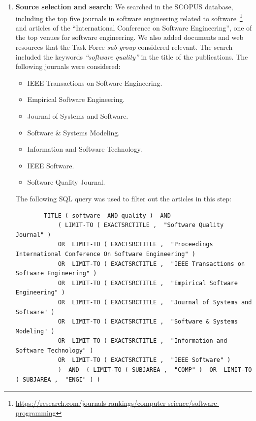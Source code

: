 \begin{enumerate}
    \item \textbf{Source selection and search}: We searched in the SCOPUS database, including the top five journals in software engineering related to software~\footnote{\url{https://research.com/journals-rankings/computer-science/software-programming}} and articles of the  ``International Conference on Software Engineering'', one of the top venues for software engineering. We also added documents and web resources that the Task Force \textit{sub-group} considered relevant. The search included the keywords \textit{``software quality''} in the title of the publications. The following journals were considered:

    \begin{itemize}
        \item IEEE Transactions on Software Engineering.
        \item Empirical Software Engineering.
        \item Journal of Systems and Software.
        \item Software \& Systems Modeling.
        \item Information and Software Technology.
        \item IEEE Software.
        \item Software Quality Journal.
    \end{itemize}

    The following SQL query was used to filter out the articles in this step:
    \begin{tiny}
    \begin{verbatim}
        TITLE ( software  AND quality )  AND  
            ( LIMIT-TO ( EXACTSRCTITLE ,  "Software Quality Journal" )  
            OR  LIMIT-TO ( EXACTSRCTITLE ,  "Proceedings International Conference On Software Engineering" ) 
            OR  LIMIT-TO ( EXACTSRCTITLE ,  "IEEE Transactions on Software Engineering" )
            OR  LIMIT-TO ( EXACTSRCTITLE ,  "Empirical Software Engineering" ) 
            OR  LIMIT-TO ( EXACTSRCTITLE ,  "Journal of Systems and Software" ) 
            OR  LIMIT-TO ( EXACTSRCTITLE ,  "Software & Systems Modeling" ) 
            OR  LIMIT-TO ( EXACTSRCTITLE ,  "Information and Software Technology" )  
            OR  LIMIT-TO ( EXACTSRCTITLE ,  "IEEE Software" )   
            )  AND  ( LIMIT-TO ( SUBJAREA ,  "COMP" )  OR  LIMIT-TO ( SUBJAREA ,  "ENGI" ) )  
    \end{verbatim}
    \end{tiny}


\end{enumerate}
